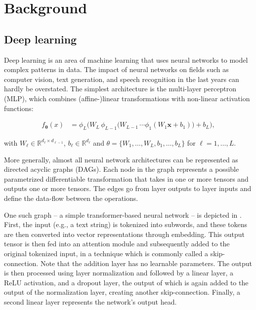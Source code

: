 \documentclass[article]{jss}
\theoremstyle{definition}
\begin{document}
\section{Background}\label{sec:background}


\subsection{Deep learning}\label{sec:background_dl}

Deep learning is an area of machine learning that uses neural networks to model complex patterns in data.
The impact of neural networks on fields such as computer vision, text generation, and speech recognition in the last years can hardly be overstated.
The simplest architecture is the multi-layer perceptron (MLP), which combines (affine-)linear transformations with non-linear activation functions:

\begin{align}
f_{\boldsymbol{\theta}}(x) &=
  \phi_{L}\!\bigl(
    W_{L}\,\phi_{L-1}\!\bigl(
      W_{L-1}\,\dotsm\phi_{1}(W_{1}\mathbf{x}+b_{1})
    \bigr)+b_{L}
  \bigr),
\end{align}

\noindent
with \(W_{\ell}\in\mathbb{R}^{d_{\ell}\times d_{\ell-1}}\), \(b_{\ell}\in\mathbb{R}^{d_{\ell}}\) and \(\theta = \{W_1, \ldots, W_L, b_1, \ldots, b_L\}\) for \(\ell=1,\dots,L\).

More generally, almost all neural network architectures can be represented as directed acyclic graphs (DAGs).
Each node in the graph represents a possible parametrized differentiable transformation that takes in one or more tensors and outputs one or more tensors.
The edges go from layer outputs to layer inputs and define the data-flow between the operations.

One such graph -- a simple transformer-based neural network -- is depicted in .
First, the input (e.g., a text string) is tokenized into subwords, and these tokens are then converted into vector representations through embedding.
This output tensor is then fed into an attention module and subsequently added to the original tokenized input, in a technique which is commonly called a skip-connection.
Note that the addition layer has no learnable parameters.
The output is then processed using layer normalization and followed by a linear layer, a ReLU activation, and a dropout layer, the output of which is again added to the output of the normalization layer, creating another skip-connection.
Finally, a second linear layer represents the network's output head.
\end{document}
